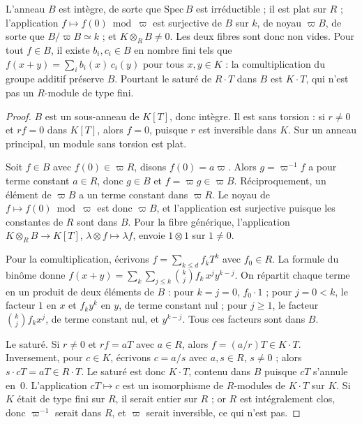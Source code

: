 \begin{encadre}
\begin{contrexemple}
L'anneau $B$ est intègre, de sorte que $\mathrm{Spec}\,B$ est irréductible ; il est plat sur $R$ ; l'application $f \mapsto f(0) \bmod \varpi$ est surjective de $B$ sur $k$, de noyau $\varpi B$, de sorte que $B/\varpi B \simeq k$ ; et $K \otimes_R B \neq 0$. Les deux fibres sont donc non vides. Pour tout $f \in B$, il existe $b_i, c_i \in B$ en nombre fini tels que $f(x + y) = \sum_i b_i(x)\,c_i(y)$ pour tous $x, y \in K$ : la comultiplication du groupe additif préserve $B$. Pourtant le saturé de $R \cdot T$ dans $B$ est $K \cdot T$, qui n'est pas un $R$-module de type fini.
\end{contrexemple}
\end{encadre}

\begin{proof}
$B$ est un sous-anneau de $K[T]$, donc intègre. Il est sans torsion : si $r \neq 0$ et $r f = 0$ dans $K[T]$, alors $f = 0$, puisque $r$ est inversible dans $K$. Sur un anneau principal, un module sans torsion est plat.

Soit $f \in B$ avec $f(0) \in \varpi R$, disons $f(0) = a\varpi$. Alors $g = \varpi^{-1} f$ a pour terme constant $a \in R$, donc $g \in B$ et $f = \varpi g \in \varpi B$. Réciproquement, un élément de $\varpi B$ a un terme constant dans $\varpi R$. Le noyau de $f \mapsto f(0) \bmod \varpi$ est donc $\varpi B$, et l'application est surjective puisque les constantes de $R$ sont dans $B$. Pour la fibre générique, l'application $K \otimes_R B \to K[T]$, $\lambda \otimes f \mapsto \lambda f$, envoie $1 \otimes 1$ sur $1 \neq 0$.

Pour la comultiplication, écrivons $f = \sum_{k \leq d} f_k T^k$ avec $f_0 \in R$. La formule du binôme donne $f(x + y) = \sum_k \sum_{j \leq k} \binom{k}{j} f_k\, x^j y^{k-j}$. On répartit chaque terme en un produit de deux éléments de $B$ : pour $k = j = 0$, $f_0 \cdot 1$ ; pour $j = 0 < k$, le facteur $1$ en $x$ et $f_k y^k$ en $y$, de terme constant nul ; pour $j \geq 1$, le facteur $\binom{k}{j} f_k x^j$, de terme constant nul, et $y^{k-j}$. Tous ces facteurs sont dans $B$.

Le saturé. Si $r \neq 0$ et $r f = a T$ avec $a \in R$, alors $f = (a/r) T \in K \cdot T$. Inversement, pour $c \in K$, écrivons $c = a/s$ avec $a, s \in R$, $s \neq 0$ ; alors $s \cdot cT = aT \in R \cdot T$. Le saturé est donc $K \cdot T$, contenu dans $B$ puisque $cT$ s'annule en~$0$. L'application $cT \mapsto c$ est un isomorphisme de $R$-modules de $K \cdot T$ sur $K$. Si $K$ était de type fini sur $R$, il serait entier sur $R$ ; or $R$ est intégralement clos, donc $\varpi^{-1}$ serait dans $R$, et $\varpi$ serait inversible, ce qui n'est pas.
\end{proof}

